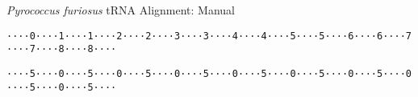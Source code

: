 \documentclass{article}
\newcommand{\digitbox}[1]{\colorbox{-}{\texttt{#1}}}
\begin{document}
\textit{Pyrococcus furiosus} tRNA Alignment: Manual

\digitbox{·}\digitbox{·}\digitbox{·}\digitbox{·}\digitbox{0}\digitbox{·}\digitbox{·}\digitbox{·}\digitbox{·}\digitbox{1}\digitbox{·}\digitbox{·}\digitbox{·}\digitbox{·}\digitbox{1}\digitbox{·}\digitbox{·}\digitbox{·}\digitbox{·}\digitbox{2}\digitbox{·}\digitbox{·}\digitbox{·}\digitbox{·}\digitbox{2}\digitbox{·}\digitbox{·}\digitbox{·}\digitbox{·}\digitbox{3}\digitbox{·}\digitbox{·}\digitbox{·}\digitbox{·}\digitbox{3}\digitbox{·}\digitbox{·}\digitbox{·}\digitbox{·}\digitbox{4}\digitbox{·}\digitbox{·}\digitbox{·}\digitbox{·}\digitbox{4}\digitbox{·}\digitbox{·}\digitbox{·}\digitbox{·}\digitbox{5}\digitbox{·}\digitbox{·}\digitbox{·}\digitbox{·}\digitbox{5}\digitbox{·}\digitbox{·}\digitbox{·}\digitbox{·}\digitbox{6}\digitbox{·}\digitbox{·}\digitbox{·}\digitbox{·}\digitbox{6}\digitbox{·}\digitbox{·}\digitbox{·}\digitbox{·}\digitbox{7}\digitbox{·}\digitbox{·}\digitbox{·}\digitbox{·}\digitbox{7}\digitbox{·}\digitbox{·}\digitbox{·}\digitbox{·}\digitbox{8}\digitbox{·}\digitbox{·}\digitbox{·}\digitbox{·}\digitbox{8}\digitbox{·}\digitbox{·}\digitbox{·}\digitbox{·}

\vspace{-0.5mm}

\digitbox{·}\digitbox{·}\digitbox{·}\digitbox{·}\digitbox{5}\digitbox{·}\digitbox{·}\digitbox{·}\digitbox{·}\digitbox{0}\digitbox{·}\digitbox{·}\digitbox{·}\digitbox{·}\digitbox{5}\digitbox{·}\digitbox{·}\digitbox{·}\digitbox{·}\digitbox{0}\digitbox{·}\digitbox{·}\digitbox{·}\digitbox{·}\digitbox{5}\digitbox{·}\digitbox{·}\digitbox{·}\digitbox{·}\digitbox{0}\digitbox{·}\digitbox{·}\digitbox{·}\digitbox{·}\digitbox{5}\digitbox{·}\digitbox{·}\digitbox{·}\digitbox{·}\digitbox{0}\digitbox{·}\digitbox{·}\digitbox{·}\digitbox{·}\digitbox{5}\digitbox{·}\digitbox{·}\digitbox{·}\digitbox{·}\digitbox{0}\digitbox{·}\digitbox{·}\digitbox{·}\digitbox{·}\digitbox{5}\digitbox{·}\digitbox{·}\digitbox{·}\digitbox{·}\digitbox{0}\digitbox{·}\digitbox{·}\digitbox{·}\digitbox{·}\digitbox{5}\digitbox{·}\digitbox{·}\digitbox{·}\digitbox{·}\digitbox{0}\digitbox{·}\digitbox{·}\digitbox{·}\digitbox{·}\digitbox{5}\digitbox{·}\digitbox{·}\digitbox{·}\digitbox{·}\digitbox{0}\digitbox{·}\digitbox{·}\digitbox{·}\digitbox{·}\digitbox{5}\digitbox{·}\digitbox{·}\digitbox{·}\digitbox{·}
\end{document}
